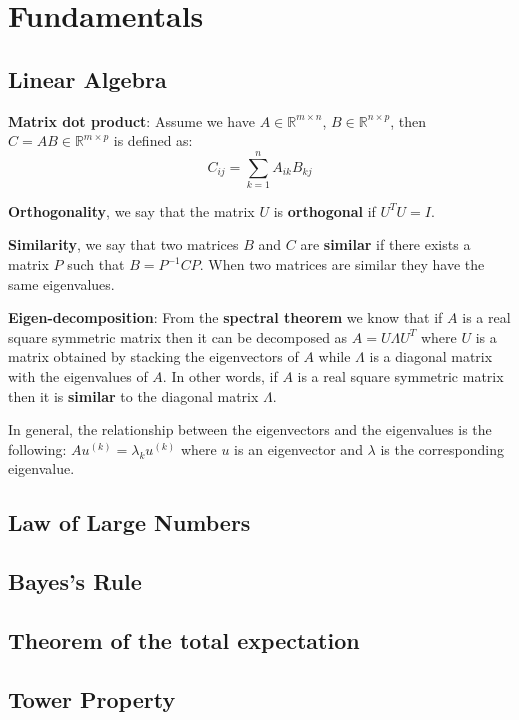 \chapter{Fundamentals}
\section{Linear Algebra}
\textbf{Matrix dot product}: Assume we have $A \in \mathbb{R}^{m \times n}$, $B \in \mathbb{R}^{n \times p}$, then $C = A B \in \mathbb{R}^{m \times p}$ is defined as:
\[
    C_{ij} = \sum_{k = 1}^{n} A_{ik} B_{kj}
\]

\textbf{Orthogonality}, we say that the matrix $U$ is \textbf{orthogonal} if $U^T U = I$.

\textbf{Similarity}, we say that two matrices $B$ and $C$ are \textbf{similar} if there exists a matrix $P$ such that $B = P^{-1} C P$. When two matrices are similar they have the same eigenvalues.

\textbf{Eigen-decomposition}: From the \textbf{spectral theorem} we know that if $A$ is a real square symmetric matrix then it can be decomposed as $A = U \Lambda U^T$ where $U$ is a matrix obtained by stacking the eigenvectors of $A$ while $\Lambda$ is a diagonal matrix with the eigenvalues of $A$. In other words, if $A$ is a real square symmetric matrix then it is \textbf{similar} to the diagonal matrix $\Lambda$.

In general, the relationship between the eigenvectors and the eigenvalues is the following: $A u^{(k)} = \lambda_k u^{(k)}$ where $u$ is an eigenvector and $\lambda$ is the corresponding eigenvalue.

\section{Law of Large Numbers}

\section{Bayes's Rule}

\section{Theorem of the total expectation}

\section{Tower Property}





